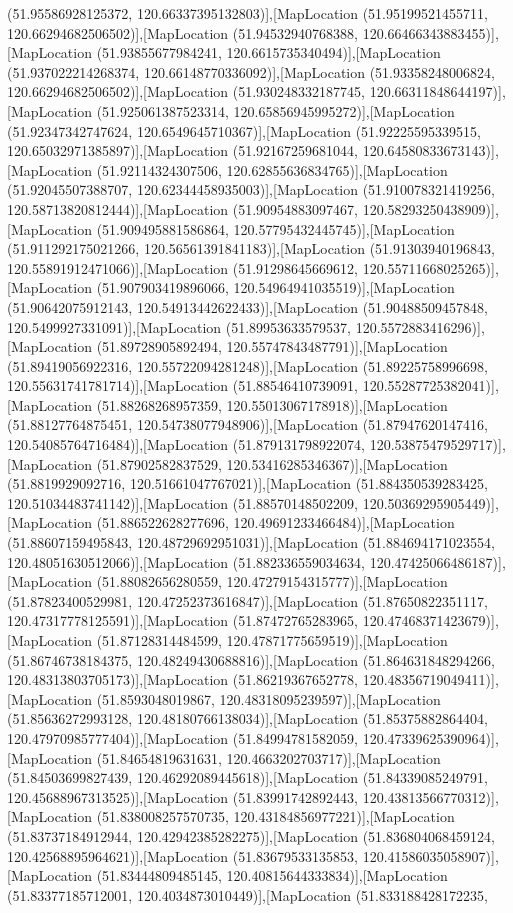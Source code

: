 (51.95586928125372, 120.66337395132803)],[MapLocation (51.95199521455711, 120.66294682506502)],[MapLocation (51.94532940768388, 120.66466343883455)],[MapLocation (51.93855677984241, 120.6615735340494)],[MapLocation (51.937022214268374, 120.66148770336092)],[MapLocation (51.93358248006824, 120.66294682506502)],[MapLocation (51.930248332187745, 120.66311848644197)],[MapLocation (51.925061387523314, 120.65856945995272)],[MapLocation (51.92347342747624, 120.6549645710367)],[MapLocation (51.92225595339515, 120.65032971385897)],[MapLocation (51.92167259681044, 120.64580833673143)],[MapLocation (51.92114324307506, 120.62855636834765)],[MapLocation (51.92045507388707, 120.62344458935003)],[MapLocation (51.910078321419256, 120.58713820812444)],[MapLocation (51.90954883097467, 120.58293250438909)],[MapLocation (51.909495881586864, 120.57795432445745)],[MapLocation (51.911292175021266, 120.56561391841183)],[MapLocation (51.91303940196843, 120.55891912471066)],[MapLocation (51.91298645669612, 120.55711668025265)],[MapLocation (51.907903419896066, 120.54964941035519)],[MapLocation (51.90642075912143, 120.54913442622433)],[MapLocation (51.90488509457848, 120.5499927331091)],[MapLocation (51.89953633579537, 120.5572883416296)],[MapLocation (51.89728905892494, 120.55747843487791)],[MapLocation (51.89419056922316, 120.55722094281248)],[MapLocation (51.89225758996698, 120.55631741781714)],[MapLocation (51.88546410739091, 120.55287725382041)],[MapLocation (51.88268268957359, 120.55013067178918)],[MapLocation (51.88127764875451, 120.54738077948906)],[MapLocation (51.87947620147416, 120.54085764716484)],[MapLocation (51.879131798922074, 120.53875479529717)],[MapLocation (51.87902582837529, 120.53416285346367)],[MapLocation (51.8819929092716, 120.51661047767021)],[MapLocation (51.884350539283425, 120.51034483741142)],[MapLocation (51.88570148502209, 120.50369295905449)],[MapLocation (51.886522628277696, 120.49691233466484)],[MapLocation (51.88607159495843, 120.48729692951031)],[MapLocation (51.884694171023554, 120.48051630512066)],[MapLocation (51.882336559034634, 120.47425066486187)],[MapLocation (51.88082656280559, 120.47279154315777)],[MapLocation (51.87823400529981, 120.47252373616847)],[MapLocation (51.87650822351117, 120.47317778125591)],[MapLocation (51.87472765283965, 120.47468371423679)],[MapLocation (51.87128314484599, 120.47871775659519)],[MapLocation (51.86746738184375, 120.48249430688816)],[MapLocation (51.864631848294266, 120.48313803705173)],[MapLocation (51.86219367652778, 120.48356719049411)],[MapLocation (51.8593048019867, 120.48318095239597)],[MapLocation (51.85636272993128, 120.48180766138034)],[MapLocation (51.85375882864404, 120.47970985777404)],[MapLocation (51.84994781582059, 120.47339625390964)],[MapLocation (51.84654819631631, 120.4663202703717)],[MapLocation (51.84503699827439, 120.46292089445618)],[MapLocation (51.84339085249791, 120.45688967313525)],[MapLocation (51.83991742892443, 120.43813566770312)],[MapLocation (51.838008257570735, 120.43184856977221)],[MapLocation (51.83737184912944, 120.42942385282275)],[MapLocation (51.836804068459124, 120.42568895964621)],[MapLocation (51.83679533135853, 120.41586035058907)],[MapLocation (51.83444809485145, 120.40815644333834)],[MapLocation (51.83377185712001, 120.4034873010449)],[MapLocation (51.833188428172235, 